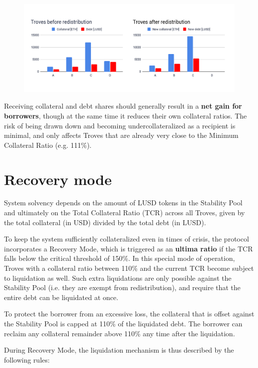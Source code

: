 \documentclass{article}
\begin{document}
\begin{figure}[H]
\centering
\includegraphics[width=16cm]{a12.png}
\end{figure} 

Receiving collateral and debt shares should generally result in a \textbf{net gain for borrowers}, though at the same time it reduces their own collateral ratios. The risk of being drawn down and becoming undercollateralized as a recipient is minimal, and only affects Troves that are already very close to the Minimum Collateral Ratio (e.g. 111\%).

\section{Recovery mode}
System solvency depends on the amount of LUSD tokens in the Stability Pool and ultimately on the Total Collateral Ratio (TCR) across all Troves, given by the total collateral (in USD) divided by the total debt (in LUSD). 

To keep the system sufficiently collateralized even in times of crisis, the protocol incorporates a Recovery Mode, which is triggered as an \textbf{ultima ratio} if the TCR falls below the critical threshold of 150\%. In this special mode of operation, Troves with a collateral ratio between 110\% and the current TCR become subject to liquidation as well. Such extra liquidations are only possible against the Stability Pool (i.e. they are exempt from redistribution), and require that the entire debt can be liquidated at once. 

To protect the borrower from an excessive loss, the collateral that is offset against the Stability Pool is capped at 110\% of the liquidated debt. The borrower can reclaim any collateral remainder above 110\% any time after the liquidation.

During Recovery Mode, the liquidation mechanism is thus described by the following rules:\\
\end{document}
